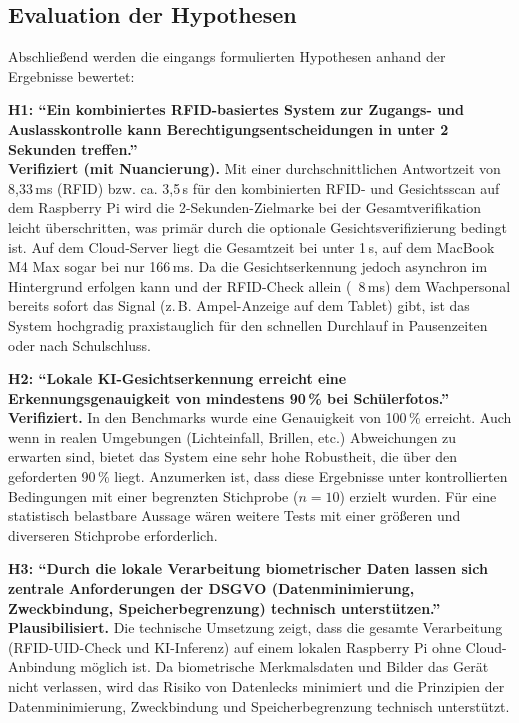 \subsection{Evaluation der Hypothesen}
\label{subsec:evaluation_hypothesen}

Abschließend werden die eingangs formulierten Hypothesen anhand der Ergebnisse bewertet:

\textbf{H1: \enquote{Ein kombiniertes RFID-basiertes System zur Zugangs- und Auslasskontrolle kann Berechtigungsentscheidungen in unter 2 Sekunden treffen.}}
\\ \textbf{Verifiziert (mit Nuancierung).} Mit einer durchschnittlichen Antwortzeit von 8,33\,ms (RFID) bzw. ca. 3,5\,s für den kombinierten RFID- und Gesichtsscan auf dem Raspberry Pi wird die 2-Sekunden-Zielmarke bei der Gesamtverifikation leicht überschritten, was primär durch die optionale Gesichtsverifizierung bedingt ist. Auf dem Cloud-Server liegt die Gesamtzeit bei unter 1\,s, auf dem MacBook M4 Max sogar bei nur 166\,ms. Da die Gesichtserkennung jedoch asynchron im Hintergrund erfolgen kann und der RFID-Check allein (~8\,ms) dem Wachpersonal bereits sofort das Signal (z.\,B. Ampel-Anzeige auf dem Tablet) gibt, ist das System hochgradig praxistauglich für den schnellen Durchlauf in Pausenzeiten oder nach Schulschluss.

\textbf{H2: \enquote{Lokale KI-Gesichtserkennung erreicht eine Erkennungsgenauigkeit von mindestens 90\,\% bei Schülerfotos.}}
\\ \textbf{Verifiziert.} In den Benchmarks wurde eine Genauigkeit von 100\,\% erreicht. Auch wenn in realen Umgebungen (Lichteinfall, Brillen, etc.) Abweichungen zu erwarten sind, bietet das System eine sehr hohe Robustheit, die über den geforderten 90\,\% liegt. Anzumerken ist, dass diese Ergebnisse unter kontrollierten Bedingungen mit einer begrenzten Stichprobe ($n = 10$) erzielt wurden. Für eine statistisch belastbare Aussage wären weitere Tests mit einer größeren und diverseren Stichprobe erforderlich.

\textbf{H3: \enquote{Durch die lokale Verarbeitung biometrischer Daten lassen sich zentrale Anforderungen der DSGVO (Datenminimierung, Zweckbindung, Speicherbegrenzung) technisch unterstützen.}}
\\ \textbf{Plausibilisiert.} Die technische Umsetzung zeigt, dass die gesamte Verarbeitung (RFID-UID-Check und KI-Inferenz) auf einem lokalen Raspberry Pi ohne Cloud-Anbindung möglich ist. Da biometrische Merkmalsdaten und Bilder das Gerät nicht verlassen, wird das Risiko von Datenlecks minimiert und die Prinzipien der Datenminimierung, Zweckbindung und Speicherbegrenzung technisch unterstützt.
